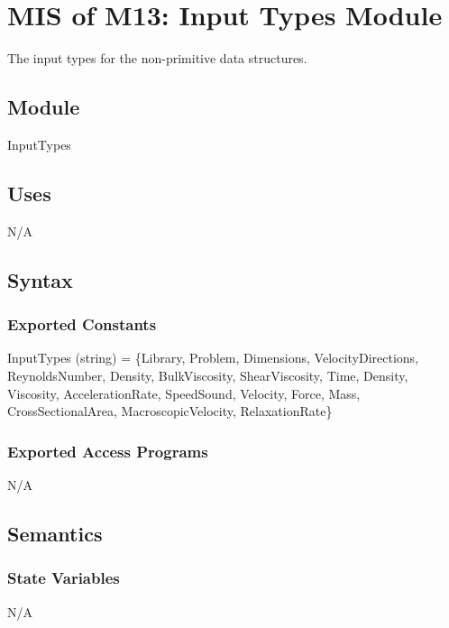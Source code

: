 \documentclass[12pt, titlepage]{article}
\begin{document}
\newpage

\section{MIS of M13: Input Types Module} \label{ITModule} 

The input types for the non-primitive data structures.

\subsection{Module}

InputTypes

\subsection{Uses}

N/A

\subsection{Syntax}

\subsubsection{Exported Constants}
InputTypes (string) = \{Library, Problem, Dimensions, VelocityDirections,
ReynoldsNumber, Density, BulkViscosity, ShearViscosity, Time, Density,
Viscosity, AccelerationRate, SpeedSound, Velocity, Force, Mass,
CrossSectionalArea, MacroscopicVelocity, RelaxationRate\} 
 
\subsubsection{Exported Access Programs}
N/A

\subsection{Semantics}

\subsubsection{State Variables}
N/A
\end{document}

